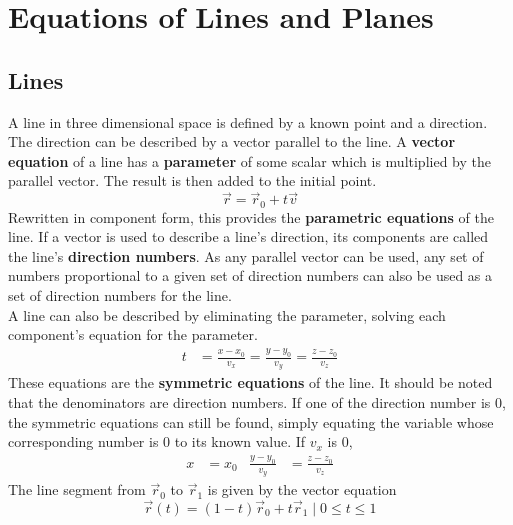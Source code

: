 \documentclass[../Calculus_\Roman{3}]{subfiles}
\begin{document}
			\section{Equations of Lines and Planes}
				\subsection*{Lines}
					A line in three dimensional space is defined by a known point and a direction. The direction can be described by a vector parallel to the line. A \textbf{vector equation} of a line has a \textbf{parameter} of some scalar which is multiplied by the parallel vector. The result is then added to the initial point.
					\[\vec{r} = \vec{r}_0 + t\vec{v}\]
					Rewritten in component form, this provides the \textbf{parametric equations} of the line.
					If a vector is used to describe a line's direction, its components are called the line's \textbf{direction numbers}. As any parallel vector can be used, any set of numbers proportional to a given set of direction numbers can also be used as a set of direction numbers for the line. \\
					A line can also be described by eliminating the parameter, solving each component's equation for the parameter.\
					\begin{align*}
						t &= \frac{x - x_0}{v_x} = \frac{y - y_0}{v_y} = \frac{z - z_0}{v_z}
					\end{align*}
					These equations are the \textbf{symmetric equations} of the line. It should be noted that the denominators are direction numbers. If one of the direction number is 0, the symmetric equations can still be found, simply equating the variable whose corresponding number is 0 to its known value. If $v_x$ is 0,
						\begin{align*}
							x &= x_0 & \frac{y - y_0}{v_y} &= \frac{z - z_0}{v_z}
						\end{align*}
					The line segment from $\vec{r}_0$ to $\vec{r}_1$ is given by the vector equation
						\[\vec{r}(t) = (1 - t)\vec{r}_0 + t\vec{r}_1 \mid 0 \le t \le 1\]
\end{document}
